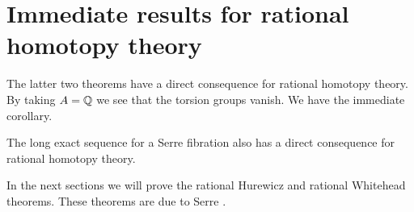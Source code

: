 \section{Immediate results for rational homotopy theory}

The latter two theorems have a direct consequence for rational homotopy theory. By taking $A = \mathbb{Q}$ we see that the torsion groups vanish. We have the immediate corollary.


The long exact sequence for a Serre fibration also has a direct consequence for rational homotopy theory.

In the next sections we will prove the rational Hurewicz and rational Whitehead theorems. These theorems are due to Serre \cite{serre}.

